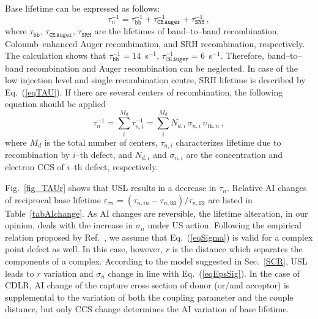 \documentclass[aip,jap, amsmath,amssymb,reprint]{revtex4-1}
\begin{document}
Base lifetime can be expressed as follows:\cite{MurphyJAP2011}
\begin{equation}
\label{eqTAUsum}
\tau_n^{-1}=\tau_\mathtt{bb}^{-1}+\tau_\mathtt{CE\,Auger}^{-1}+\tau_\mathtt{SRH}^{-1}\,,
\end{equation}
where
$\tau_\mathtt{bb}$, $\tau_\mathtt{CE\,Auger}$, $\tau_\mathtt{SRH}$ are the lifetimes of band--to--band recombination, Coloumb--enhanced Auger recombination, and
SRH recombination, respectively.
The calculation shows that $\tau_\mathtt{bb}^{-1}=14$~s$^{-1}$, $\tau_\mathtt{CE\,Auger}^{-1}=6$~s$^{-1}$.
Therefore, band--to--band recombination and Auger recombination can be neglected.
In case of the low injection level and single recombination centre, SRH lifetime is described by Eq.~(\ref{eqTAU}).
If there are  several centers of recombination, the following equation should be applied
\begin{equation}
\label{eqTAUSHRsum}
\tau_n^{-1}=\sum_i^{M_d}\tau_{n,i}^{-1}=\sum_i^{M_d}N_{d,i}\,\sigma_{n,i}\,\upsilon_{\mathrm{th},n}\,,
\end{equation}
where
$M_d$ is the total number of centers,
$\tau_{n,i}$ characterizes lifetime due to recombination by $i$--th defect,
and $N_{d,i}$ and $\sigma_{n,i}$ are the concentration and electron CCS of $i$--th defect, respectively.

Fig.~\ref{fig_TAUr} shows that USL results in a decrease in $\tau_n$.
Relative AI changes of reciprocal base lifetime $\varepsilon_{\tau n}=(\tau_{n,in}-\tau_{n,\mathtt{US}})/\tau_{n,\mathtt{US}}$
are listed in Table~\ref{tabAIchange}.
As AI changes are reversible, the lifetime alteration, in our opinion, deals with the increase in $\sigma_n$ under US action.
Following the empirical relation  proposed by Ref.~, we assume that Eq.~(\ref{eqSigma})
is valid for a complex point defect as well.
In this case, however, $r$ is the distance which separates the components of a complex.
According to the model suggested in Sec.~\ref{SCR}, USL leads to $r$ variation
and $\sigma_n$ change in line with Eq.~(\ref{eqEpsSig}).
In the case of CDLR, AI change of the capture cross section of donor (or/and acceptor) is supplemental to the variation of
both the coupling parameter and the couple distance,
but only CCS change determines the AI variation of base lifetime.
\end{document}
